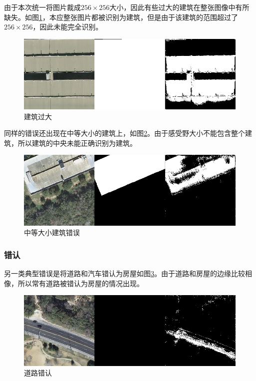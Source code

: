由于本次统一将图片裁成$256\times 256$大小，因此有些过大的建筑在整张图像中有所缺失。如图\ref{Fig:big_building}，本应整张图片都被识别为建筑，但是由于该建筑的范围超过了$256\times256$，因此未能完全识别。
\begin{figure}[htbp]
    
    \centering
    \includegraphics[width=1\textwidth]{Figures/错误/建筑过大.png}
    \caption{建筑过大}
    \label{Fig:big_building}
    
\end{figure}

同样的错误还出现在中等大小的建筑上，如图\ref{Fig:middle_building}。由于感受野大小不能包含整个建筑，所以建筑的中央未能正确识别为建筑。
\begin{figure}[htbp]
    
    \centering
    \includegraphics[width=1\textwidth]{Figures/错误/中等建筑.png}
    \caption{中等大小建筑错误}
    \label{Fig:middle_building}
    
\end{figure}

\subsubsection{错认}

另一类典型错误是将道路和汽车错认为房屋如图\ref{Fig:error_road}。由于道路和房屋的边缘比较相像，所以常有道路被错认为房屋的情况出现。
\begin{figure}[htbp]
    
    \centering
    \includegraphics[width=1\textwidth]{Figures/错误/道路错认.png}
    \caption{道路错认}
    \label{Fig:error_road}
    
\end{figure}

